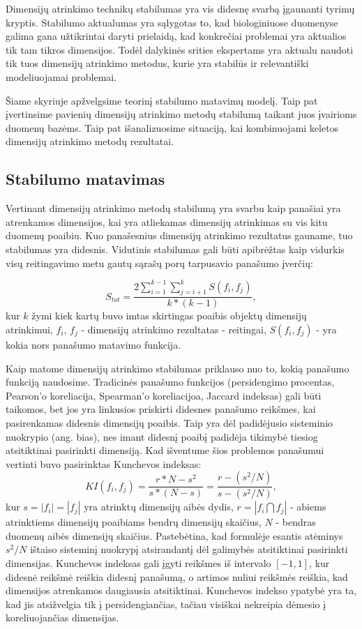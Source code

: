 Dimensijų atrinkimo technikų stabilumas yra vis didesnę svarbą įgaunanti tyrimų
kryptis. Stabilumo aktualumas yra sąlygotas to, kad biologiniuose duomenyse
galima gana užtikrintai daryti prielaidą, kad konkrečiai problemai yra
aktualios tik tam tikros dimensijos. Todėl dalykinės srities ekspertams yra
aktualu naudoti tik tuos dimensijų atrinkimo metodus, kurie yra stabilūs ir 
relevantiški modeliuojamai problemai.

Šiame skyriuje apžvelgsime teorinį stabilumo matavimų modelį.
Taip pat įvertinsime pavienių dimensijų atrinkimo metodų stabilumą
taikant juos įvairioms duomenų bazėms. Taip pat išanalizuosime situaciją, kai
kombinuojami keletos dimensijų atrinkimo metodų rezultatai.

\subsection{Stabilumo matavimas}

Vertinant dimensijų atrinkimo metodų stabilumą yra svarbu kaip panašiai yra
atrenkamos dimensijos, kai yra atliekamas dimensijų atrinkimas su vis kitu 
duomenų poaibiu. Kuo panašesnius dimensijų atrinkimo rezultatus gauname, tuo stabilumas
yra didesnis. Vidutinis stabilumas gali būti apibrėžtas kaip vidurkis visų 
reitingavimo metu gautų sąrašų porų tarpusavio panašumo įverčių:

\begin{equation}
 S_{tot}=\frac{2\sum_{i=1}^{k-1}\sum_{j=i+1}^{k} S(f_i, f_j)}{k*(k-1)},
\end{equation} 
kur $k$ žymi kiek kartų buvo imtas skirtingas poaibis objektų dimensijų atrinkimui,
$f_i$, $f_j$ - dimensijų atrinkimo rezultatas - reitingai, $S(f_i, f_j)$ - yra kokia 
nors panašumo matavimo funkcija.

Kaip matome dimensijų atrinkimo stabilumas priklauso nuo to, kokią panašumo 
funkciją naudosime. Tradicinės panašumo funkcijos (persidengimo procentas, 
Pearson'o koreliacija, Spearman'o koreliacijoa, Jaccard indeksas) 
gali būti taikomos, bet jos yra linkusios priskirti didesnes panašumo
reikšmes, kai pasirenkamas didesnis dimensijų poaibis. Taip yra dėl padidėjusio 
sisteminio nuokrypio (ang. bias), nes imant didesnį poaibį padidėja tikimybė
tiesiog atsitiktinai pasirinkti dimensiją. 
Kad išventume šios problemos panašumui vertinti buvo pasirinktas Kunchevos
\cite{DBLP:conf/aia/Kuncheva07} indeksas:
\begin{equation}
 KI(f_i, f_j)=\frac{r*N - s^2}{s*(N-s)}=\frac{r - (s^2/N)}{s - (s^2/N)},
\end{equation}		
kur $s=|f_i|=|f_j|$ yra atrinktų dimensijų aibės dydis, $r=|f_i \bigcap f_j|$ -
abiems atrinktiems dimensijų poaibiams bendrų dimensijų skaičius, $N$ - bendras
 duomenų aibės
dimensijų skaičius. Pastebėtina, kad formulėje esantis atėminys $s^2/N$ ištaiso 
sisteminį nuokrypį atsirandantį dėl galimybės atsitiktinai pasirinkti dimensijas.
Kunchevos indeksas gali įgyti reikšmes iš intervalo
$[-1, 1]$, kur didesnė reikšmė reiškia didesnį panašumą, o artimos nuliui 
reikšmės reiškia, kad dimensijos atrenkamos daugiausia atsitiktinai. Kunchevos 
indekso ypatybė yra ta, kad jis atsižvelgia tik į
persidengiančias, tačiau visiškai nekreipia dėmesio į koreliuojančias dimensijas.

